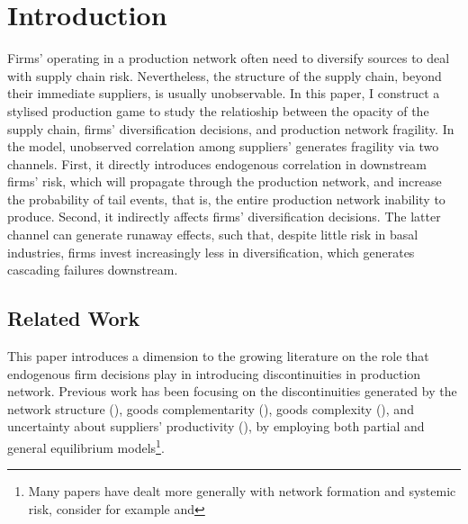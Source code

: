 \documentclass[../../main.tex]{subfiles}
\begin{document}
\section{Introduction}

\iffalse
\notes{
  \begin{enumerate}
    \item Research question
    \item Contribution to the literature
    \item Why do we care?
  \end{enumerate}
}
\fi

Firms' operating in a production network often need to diversify sources to deal with supply chain risk. Nevertheless, the structure of the supply chain, beyond their immediate suppliers, is usually unobservable. In this paper, I construct a stylised production game to study the relatioship between the opacity of the supply chain, firms' diversification decisions, and production network fragility. In the model, unobserved correlation among suppliers' generates fragility via two channels. First, it directly introduces endogenous correlation in downstream firms' risk, which will propagate through the production network, and increase the probability of tail events, that is, the entire production network inability to produce. Second, it indirectly affects firms' diversification decisions. The latter channel can generate runaway effects, such that, despite little risk in basal industries, firms invest increasingly less in diversification, which generates cascading failures downstream.

\subsection{Related Work}

This paper introduces a dimension to the growing literature on the role that endogenous firm decisions play in introducing discontinuities in production network. Previous work has been focusing on the discontinuities generated by the network structure (\cite{baqaee_macroeconomic_2019}), goods complementarity (\cite{acemoglu_endogenous_2020}), goods complexity (\cite{elliott_supply_2022}), and uncertainty about suppliers' productivity (\cite{kopytov_endogenous_2021}), by employing both partial and general equilibrium models\footnote{Many papers have dealt more generally with network formation and systemic risk, consider for example  and }.
\end{document}
